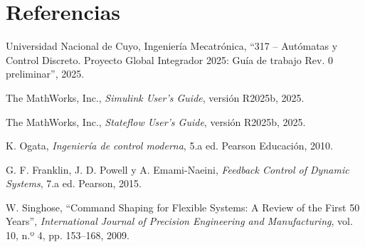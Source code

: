 \documentclass[a4paper,10pt,onecolumn,journal]{ieeeconf}
\numberwithin{equation}{section}
\begin{document}
\section{Referencias}
\thispagestyle{mystyle}
{\small
\noindent [1] Universidad Nacional de Cuyo, Ingeniería Mecatrónica, ``317 -- Autómatas y Control Discreto. Proyecto Global Integrador 2025: Guía de trabajo Rev. 0 preliminar'', 2025.\par
\noindent [2] The MathWorks, Inc., \textit{Simulink User's Guide}, versión R2025b, 2025.\par
\noindent [3] The MathWorks, Inc., \textit{Stateflow User's Guide}, versión R2025b, 2025.\par
\noindent [4] K. Ogata, \textit{Ingeniería de control moderna}, 5.a ed. Pearson Educación, 2010.\par
\noindent [5] G. F. Franklin, J. D. Powell y A. Emami-Naeini, \textit{Feedback Control of Dynamic Systems}, 7.a ed. Pearson, 2015.\par
\noindent [6] W. Singhose, ``Command Shaping for Flexible Systems: A Review of the First 50 Years'', \textit{International Journal of Precision Engineering and Manufacturing}, vol. 10, n.º 4, pp. 153--168, 2009.\par
}
\end{document}
